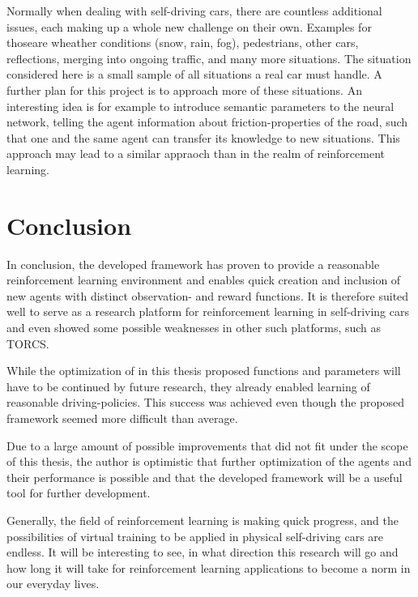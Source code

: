 Normally when dealing with self-driving cars, there are countless additional issues, each making up a whole new challenge on their own. Examples for thoseare wheather conditions (snow, rain, fog), pedestrians, other cars, reflections, merging into ongoing traffic, and many more situations. The situation considered here is a small sample of all situations a real car must handle. A further plan for this project is to approach more of these situations. An interesting idea is for example to introduce semantic parameters to the neural network, telling the agent information about friction-properties of the road, such that one and the same agent can transfer its knowledge to new situations. This approach may lead to a similar appraoch than \cite{chen_infogan:_2016} in the realm of reinforcement learning.

\section {Conclusion}

In conclusion, the developed framework has proven to provide a reasonable reinforcement learning environment and enables quick creation and inclusion of new agents with distinct observation- and reward functions. It is therefore suited well to serve as a research platform for reinforcement learning in self-driving cars and even showed some possible weaknesses in other such platforms, such as TORCS. 

While the optimization of in this thesis proposed functions and parameters will have to be continued by future research, they already enabled learning of reasonable driving-policies. This success was achieved even though the proposed framework seemed more difficult than average.

Due to a large amount of possible improvements that did not fit under the scope of this thesis, the author is optimistic that further optimization of the agents and their performance is possible and that the developed framework will be a useful tool for further development. 

Generally, the field of reinforcement learning is making quick progress, and the possibilities of virtual training to be applied in physical self-driving cars are endless.
It will be interesting to see, in what direction this research will go and how long it will take for reinforcement learning applications to become a norm in our everyday lives.  



